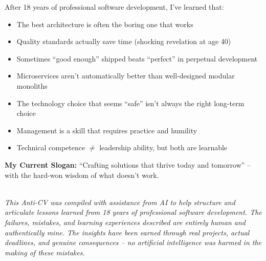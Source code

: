 \documentclass[11pt,a4paper]{article}
\begin{document}
After 18 years of professional software development, I've learned that:

\begin{itemize}[leftmargin=15pt, topsep=0pt, itemsep=2pt]
\item The best architecture is often the boring one that works
\item Quality standards actually save time (shocking revelation at age 40)
\item Sometimes ``good enough'' shipped beats ``perfect'' in perpetual development
\item Microservices aren't automatically better than well-designed modular monoliths
\item The technology choice that seems ``safe'' isn't always the right long-term choice
\item Management is a skill that requires practice and humility
\item Technical competence $\neq$ leadership ability, but both are learnable
\end{itemize}

\textbf{My Current Slogan:} ``Crafting solutions that thrive today and tomorrow'' -- with the hard-won wisdom of what doesn't work.

\vfill

\hrulefill\\
\textit{This Anti-CV was compiled with assistance from AI to help structure and articulate lessons learned from 18 years of professional software development. The failures, mistakes, and learning experiences described are entirely human and authentically mine. The insights have been earned through real projects, actual deadlines, and genuine consequences -- no artificial intelligence was harmed in the making of these mistakes.}
\end{document}
